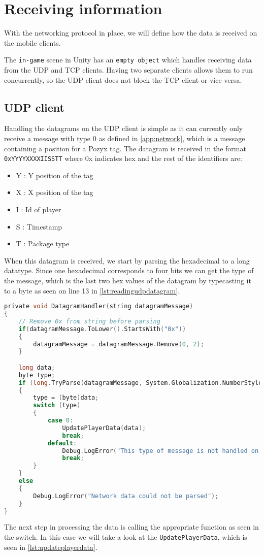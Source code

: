 \section{Receiving information}\label{sec:receiving-the-information}
With the networking protocol in place, we will define how the data is received on the mobile clients.

The \texttt{in-game} scene in Unity has an \texttt{empty object} which handles receiving data from the UDP and TCP clients.
Having two separate clients allows them to run concurrently, so the UDP client does not block the TCP client or vice-versa.

\subsection*{UDP client}
Handling the datagrams on the UDP client is simple as it can currently only receive a message with type 0 as defined in \autoref{app:network}, which is a message containing a position for a Pozyx tag.
The datagram is received in the format \texttt{0xYYYYXXXXIISSTT} where 0x indicates hex and the rest of the identifiers are:
\begin{itemize}
    \item Y : Y position of the tag
    \item X : X position of the tag
    \item I : Id of player
    \item S : Timestamp
    \item T : Package type
\end{itemize}

\noindent
When this datagram is received, we start by parsing the hexadecimal to a long datatype.
Since one hexadecimal corresponds to four bits we can get the type of the message, which is the last two hex values of the datagram by typecasting it to a byte as seen on line 13 in \autoref{lst:readingudpdatagram}.

\begin{lstlisting}[caption={Processing datagrams in UDP client}, captionpos=b,language=C,label={lst:readingudpdatagram}]
private void DatagramHandler(string datagramMessage)
{
    // Remove 0x from string before parsing
    if(datagramMessage.ToLower().StartsWith("0x"))
    {
        datagramMessage = datagramMessage.Remove(0, 2);
    }

    long data;
    byte type;
    if (long.TryParse(datagramMessage, System.Globalization.NumberStyles.HexNumber, System.Globalization.CultureInfo.InvariantCulture, out data))
    {
        type = (byte)data;
        switch (type)
        {
            case 0:
                UpdatePlayerData(data);
                break;
            default:
                Debug.LogError("This type of message is not handled on UDP");
                break;
        }
    }
    else
    {
        Debug.LogError("Network data could not be parsed");
    }
}
\end{lstlisting}
\noindent
The next step in processing the data is calling the appropriate function as seen in the switch.
In this case we will take a look at the \texttt{UpdatePlayerData}, which is seen in \autoref{lst:updateplayerdata}.

